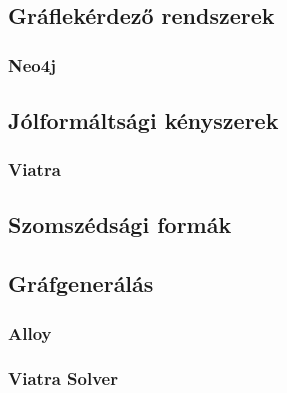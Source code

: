 \chapter{\eloismeretek}

\section{Gráflekérdező rendszerek}
\subsection{Neo4j}


\section{Jólformáltsági kényszerek}
\subsection{Viatra}

\section{Szomszédsági formák}

\section{Gráfgenerálás}

\subsection{Alloy}
\subsection{Viatra Solver}



